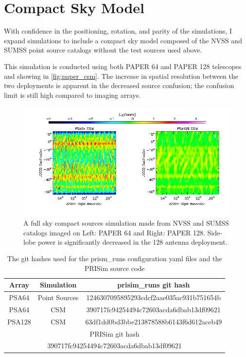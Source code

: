 \documentclass[hidelinks]{article}
\begin{document}
\section{Compact Sky Model}{
With confidence in the positioning, rotation, and parity of the simulations, I expand simulations to include a compact sky model composed of the NVSS and SUMSS point source catalogs without the test sources used above.

This simulation is conducted using both PAPER 64 and PAPER 128 telescopes and showing in \autoref{fig:paper_csm}. The increase in spatial resolution between the two deployments is apparent in the decreased source confusion; the confusion limit is still high compared to imaging arrays.

\begin{figure}[t]
\centering
\includegraphics[width=.8\textwidth]{paper_csm_compare.png}
\caption{\label{fig:paper_csm} A full sky compact sources simulation made from NVSS and SUMSS catalogs imaged on Left: PAPER 64 and Right: PAPER 128. Side-lobe power is significantly decreased in the 128 antenna deployment.}
\end{figure}

}

\begin{table}[p]
\centering
\begin{tabular}{c c c}
\hline
Array &Simulation  & prisim\_runs git hash \\ \hline \hline
PSA64 & Point Sources & 1246307095895293cdcf2aae035ac931b751654b \\
PSA64 & CSM & 390717fc94254494c72603acda6dbab13df09621 \\
PSA128 & CSM & 63df1dd0bd3bbe213878588b6143f6d612aceb49 \\ \hline \hline
\multicolumn{3}{c}{PRISim git hash} \\
\multicolumn{3}{c}{390717fc94254494c72603acda6dbab13df09621}
\end{tabular}
\caption{\label{tab:githash} The git hashes used for the prism\_runs configuration yaml files and the PRISim source code}
\end{table}
\end{document}
